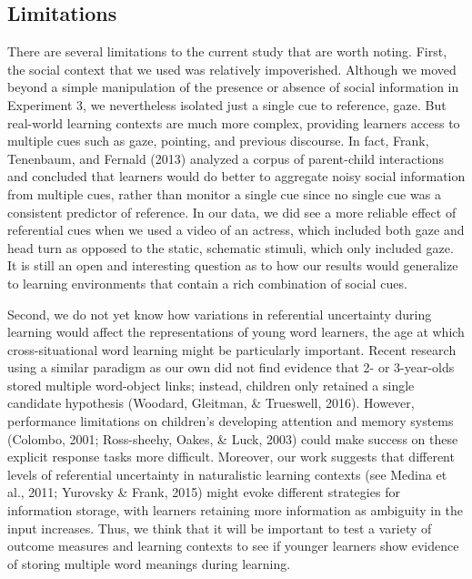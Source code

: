 \documentclass[oneside]{report}
\begin{document}
\hypertarget{limitations}{%
\subsection{Limitations}\label{limitations}}

There are several limitations to the current study that are worth
noting. First, the social context that we used was relatively
impoverished. Although we moved beyond a simple manipulation of the
presence or absence of social information in Experiment 3, we
nevertheless isolated just a single cue to reference, gaze. But
real-world learning contexts are much more complex, providing learners
access to multiple cues such as gaze, pointing, and previous discourse.
In fact, Frank, Tenenbaum, and Fernald (2013) analyzed a corpus of
parent-child interactions and concluded that learners would do better to
aggregate noisy social information from multiple cues, rather than
monitor a single cue since no single cue was a consistent predictor of
reference. In our data, we did see a more reliable effect of referential
cues when we used a video of an actress, which included both gaze and
head turn as opposed to the static, schematic stimuli, which only
included gaze. It is still an open and interesting question as to how
our results would generalize to learning environments that contain a
rich combination of social cues.

Second, we do not yet know how variations in referential uncertainty
during learning would affect the representations of young word learners,
the age at which cross-situational word learning might be particularly
important. Recent research using a similar paradigm as our own did not
find evidence that 2- or 3-year-olds stored multiple word-object links;
instead, children only retained a single candidate hypothesis (Woodard,
Gleitman, \& Trueswell, 2016). However, performance limitations on
children's developing attention and memory systems (Colombo, 2001;
Ross-sheehy, Oakes, \& Luck, 2003) could make success on these explicit
response tasks more difficult. Moreover, our work suggests that
different levels of referential uncertainty in naturalistic learning
contexts (see Medina et al., 2011; Yurovsky \& Frank, 2015) might evoke
different strategies for information storage, with learners retaining
more information as ambiguity in the input increases. Thus, we think
that it will be important to test a variety of outcome measures and
learning contexts to see if younger learners show evidence of storing
multiple word meanings during learning.
\end{document}
